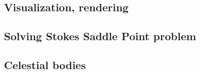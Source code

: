 \subsection{Visualization, rendering}

{\scriptsize
\noindent
\cite{faha}
\cite{chzy08}\cite{stmt08}\cite{bikh08}
\cite{may12}
\cite{cram18}
}

\subsection{Solving Stokes Saddle Point problem}

{\scriptsize
\noindent
\cite{laqu86}
\cite{rotf90}
\cite{frha93}
\cite{elgo94}
\cite{cheb96}\cite{elma96}
\cite{brpv97}
\cite{lixu01}
\cite{dogs06}\cite{lica06}
\cite{hoow17}
}

\subsection{Celestial bodies}

